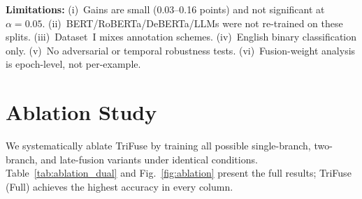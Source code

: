 \documentclass[10pt,twocolumn,a4paper]{article}
\begin{document}
\textbf{Limitations:} (i)~Gains are small (0.03--0.16 points) and not significant at $\alpha{=}0.05$. (ii)~BERT/RoBERTa/DeBERTa/LLMs were not re-trained on these splits. (iii)~Dataset~I mixes annotation schemes. (iv)~English binary classification only. (v)~No adversarial or temporal robustness tests. (vi)~Fusion-weight analysis is epoch-level, not per-example.

\section{Ablation Study}\label{sec:ablation}

We systematically ablate TriFuse by training all possible single-branch, two-branch, and late-fusion variants under identical conditions. Table~\ref{tab:ablation_dual} and Fig.~\ref{fig:ablation} present the full results; TriFuse (Full) achieves the highest accuracy in every column.

\begin{table}[!t]
\caption{Branch-level ablation results (\%).}
\label{tab:ablation_dual}
\centering
{}
\end{table}
\end{document}
